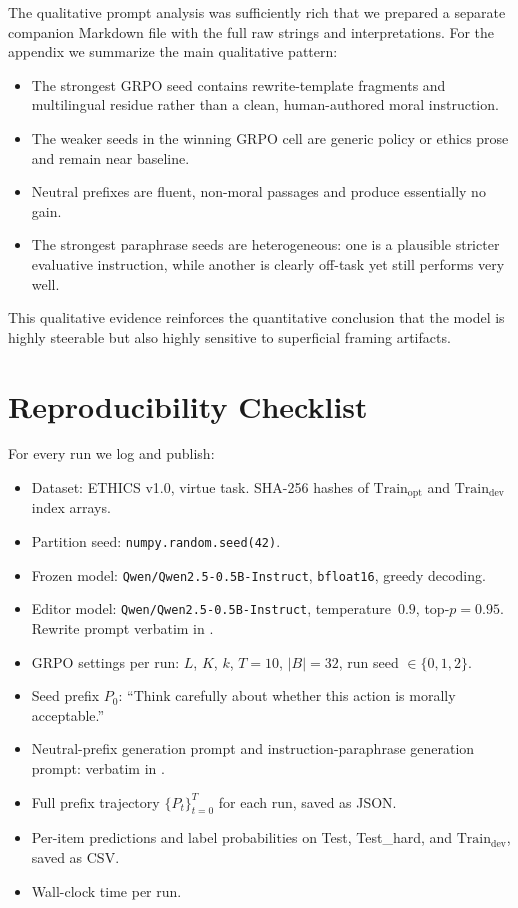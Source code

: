 \documentclass[preprint]{article}
\newcommand{\Trainopt}{\text{Train}_{\text{opt}}}
\newcommand{\Traindev}{\text{Train}_{\text{dev}}}
\begin{document}
The qualitative prompt analysis was sufficiently rich that we prepared a separate companion Markdown file with the full raw strings and interpretations.
For the appendix we summarize the main qualitative pattern:

\begin{itemize}
    \item The strongest GRPO seed contains rewrite-template fragments and multilingual residue rather than a clean, human-authored moral instruction.
    \item The weaker seeds in the winning GRPO cell are generic policy or ethics prose and remain near baseline.
    \item Neutral prefixes are fluent, non-moral passages and produce essentially no gain.
    \item The strongest paraphrase seeds are heterogeneous: one is a plausible stricter evaluative instruction, while another is clearly off-task yet still performs very well.
\end{itemize}

This qualitative evidence reinforces the quantitative conclusion that the model is highly steerable but also highly sensitive to superficial framing artifacts.

\section{Reproducibility Checklist}
\label{app:reproducibility}

For every run we log and publish:
\begin{itemize}
    \item Dataset: ETHICS v1.0, virtue task. SHA-256 hashes of $\Trainopt$ and $\Traindev$ index arrays.
    \item Partition seed: \texttt{numpy.random.seed(42)}.
    \item Frozen model: \texttt{Qwen/Qwen2.5-0.5B-Instruct}, \texttt{bfloat16}, greedy decoding.
    \item Editor model: \texttt{Qwen/Qwen2.5-0.5B-Instruct}, temperature~$0.9$, top-$p = 0.95$. Rewrite prompt verbatim in .
    \item GRPO settings per run: $L$, $K$, $k$, $T = 10$, $|B| = 32$, run seed $\in \{0, 1, 2\}$.
    \item Seed prefix $P_0$: ``Think carefully about whether this action is morally acceptable.''
    \item Neutral-prefix generation prompt and instruction-paraphrase generation prompt: verbatim in .
    \item Full prefix trajectory $\{P_t\}_{t=0}^{T}$ for each run, saved as JSON.
    \item Per-item predictions and label probabilities on Test, Test\_hard, and $\Traindev$, saved as CSV.
    \item Wall-clock time per run.
\end{itemize}
\end{document}
